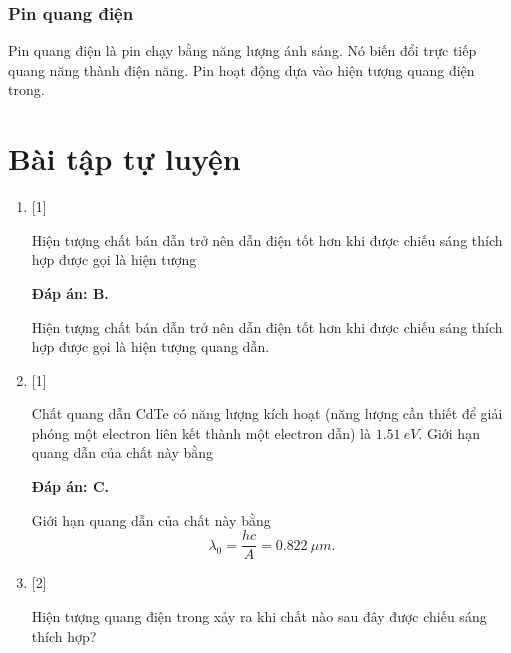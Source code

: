 \subsubsection{Pin quang điện}
Pin quang điện là pin chạy bằng năng lượng ánh sáng. Nó biến đổi trực tiếp quang năng thành điện năng. Pin hoạt động dựa vào hiện tượng quang điện trong.

\section{Bài tập tự luyện}
\begin{enumerate}[label=\bfseries Câu \arabic*:]
	
	\item {} [1]
	\cauhoi
	{Hiện tượng chất bán dẫn trở nên dẫn điện tốt hơn khi được chiếu sáng thích hợp được gọi là hiện tượng
	}
	
	\loigiai
	{		\textbf{Đáp án: B.}
		
		Hiện tượng chất bán dẫn trở nên dẫn điện tốt hơn khi được chiếu sáng thích hợp được gọi là hiện tượng quang dẫn.
	}
	
	\item {} [1]
	\cauhoi
	{Chất quang dẫn CdTe có năng lượng kích hoạt (năng lượng cần thiết để giải phóng một electron liên kết thành một electron dẫn) là $\SI{1,51}{eV}$. Giới hạn quang dẫn của chất này bằng
	}
	
	\loigiai
	{		\textbf{Đáp án: C.}
		
		Giới hạn quang dẫn của chất này bằng
		$$
		\lambda_{0} = \dfrac{hc}{A} = \SI{0,822}{\mu m}.
		$$
	}
	
	\item {} [2]
	\cauhoi
	{Hiện tượng quang điện trong xảy ra khi chất nào sau đây được chiếu sáng thích hợp?
	}
	

\end{enumerate}
